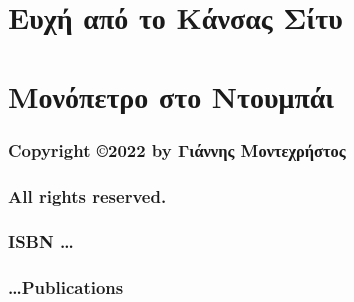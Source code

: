 \documentclass[12pt]{book}
\begin{document}
\chapter{Ευχή από το Κάνσας Σίτυ}


\chapter{Μονόπετρο στο Ντουμπάι}



\backmatter

\subsection*{\center \normalsize Copyright \copyright 2022 by Γιάννης Μοντεχρήστος}
\subsection*{\center \normalsize All rights reserved.}
\subsection*{\center \normalsize ISBN \dots}
\subsection*{\center \normalsize \dots Publications}
\end{document}
